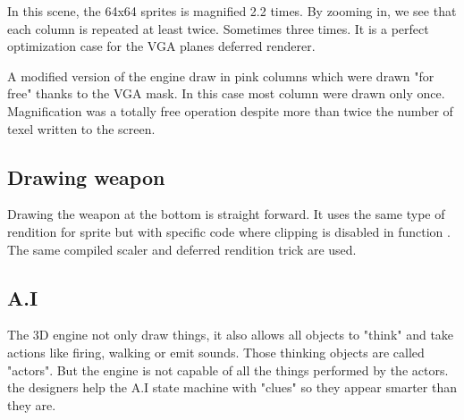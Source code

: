 \par
\begin{figure}[H]
 \centering
\end{figure}
In this scene, the 64x64 sprites is magnified 2.2 times. By zooming in, we see that each column is repeated at least twice. Sometimes three times. It is a perfect optimization case for the VGA planes deferred renderer.
\par
\begin{figure}[H]
 \centering
\end{figure}
A modified version of the engine draw in pink columns which were drawn "for free" thanks to the VGA mask. In this case most column were drawn only once. Magnification was a totally free operation despite more than twice the number of texel written to the screen.\\
\begin{figure}[H]
 \centering
\end{figure}






\subsection{Drawing weapon}
Drawing the weapon at the bottom is straight forward. It uses the same type of rendition for sprite but with specific code where clipping is disabled in function . The same compiled scaler and deferred rendition trick are used.














\subsection{A.I}
The 3D engine not only draw things, it also allows all objects to "think" and take actions like firing, walking or emit sounds. Those thinking objects are called "actors". But the engine is not capable of all the things performed by the actors. the designers help the A.I state machine with "clues" so they appear smarter than they are.\\
\par






